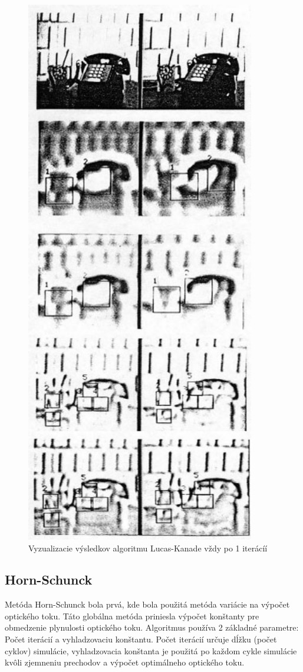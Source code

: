 \begin{figure}[H]
  \centering
  \includegraphics[width=10cm]{pics/lukas-kanade.jpg}
  \caption{Vyzualizacie výsledkov algoritmu Lucas-Kanade vždy po 1 iterácíí}
\end{figure}
\vspace{10mm}

\subsection{Horn-Schunck}
Metóda Horn-Schunck bola prvá, kde bola použitá metóda variácie na výpočet optického toku.
Táto globálna metóda priniesla výpočet  konštanty pre obmedzenie plynulosti optického toku.
Algoritmus používa 2 základné parametre: Počet iterácií a vyhladzovaciu konštantu.
Počet iterácií určuje dĺžku (počet cyklov) simulácie, vyhladzovacia konštanta je použitá po každom cykle simulácie kvôli zjemneniu prechodov a výpočet optimálneho optického toku.

